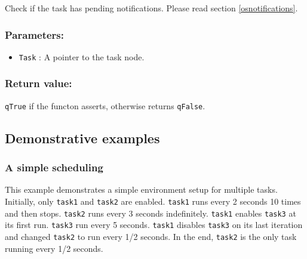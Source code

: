 Check if the task has pending notifications. Please read section \ref{osnotifications}. 

\subsubsection*{Parameters:}
\begin{itemize}
    \item \lstinline{Task} : A pointer to the task node.
\end{itemize}

\subsubsection*{Return value:}
\lstinline{qTrue} if the functon asserts, otherwise returns \lstinline{qFalse}.

\subsection{Demonstrative examples}
\subsubsection{A simple scheduling}
This example demonstrates a simple environment setup for multiple tasks. Initially, only \lstinline{task1} and \lstinline{task2} are enabled. \lstinline{task1} runs every 2 seconds 10 times and then stops. \lstinline{task2} runs every 3 seconds indefinitely. \lstinline{task1} enables \lstinline{task3} at its first run. \lstinline{task3} run every 5 seconds. \lstinline{task1} disables \lstinline{task3} on its last iteration and changed \lstinline{task2} to run every 1/2 seconds. In the end, \lstinline{task2} is the only task running every 1/2 seconds. \\

